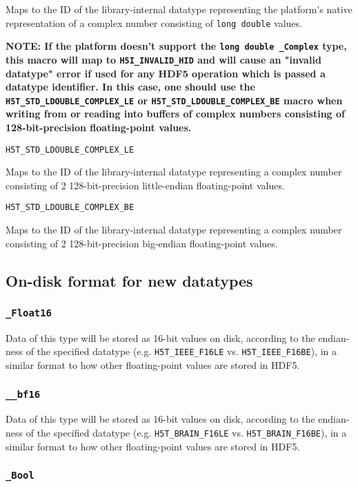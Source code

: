 \documentclass[../HDF5_RFC.tex]{subfiles}
\begin{document}
Maps to the ID of the library-internal datatype representing the platform's native representation
of a complex number consisting of \texttt{long double} values.

\textbf{NOTE: If the platform doesn't support the \texttt{long double \_Complex} type, this macro will
map to \texttt{H5I\_INVALID\_HID} and will cause an "invalid datatype" error if used for any HDF5
operation which is passed a datatype identifier. In this case, one should use the \texttt{H5T\_STD\_LDOUBLE\_COMPLEX\_LE}
or \texttt{H5T\_STD\_LDOUBLE\_COMPLEX\_BE} macro when writing from or reading into buffers of complex numbers
consisting of 128-bit-precision floating-point values.}

\texttt{H5T\_STD\_LDOUBLE\_COMPLEX\_LE}

Maps to the ID of the library-internal datatype representing a complex number consisting of 2
128-bit-precision little-endian floating-point values.

\texttt{H5T\_STD\_LDOUBLE\_COMPLEX\_BE}

Maps to the ID of the library-internal datatype representing a complex number consisting of 2
128-bit-precision big-endian floating-point values.

\subsection{On-disk format for new datatypes}

\subsubsection{\texttt{\_Float16}}

Data of this type will be stored as 16-bit values on disk, according to the endian-ness of the specified
datatype (e.g. \texttt{H5T\_IEEE\_F16LE} vs. \texttt{H5T\_IEEE\_F16BE}), in a similar format to how other
floating-point values are stored in HDF5.

\subsubsection{\texttt{\_\_bf16}}

Data of this type will be stored as 16-bit values on disk, according to the endian-ness of the specified
datatype (e.g. \texttt{H5T\_BRAIN\_F16LE} vs. \texttt{H5T\_BRAIN\_F16BE}), in a similar format to how other
floating-point values are stored in HDF5.

\subsubsection{\texttt{\_Bool}}
\end{document}
